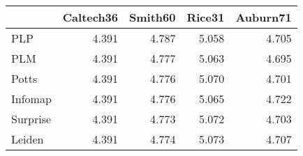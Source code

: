 \begin{tabular}{lrrrr}
\toprule
{} & Caltech36 & Smith60 & Rice31 & Auburn71 \\
\midrule
PLP      &     4.391 &   4.787 &  5.058 &    4.705 \\
PLM      &     4.391 &   4.777 &  5.063 &    4.695 \\
Potts    &     4.391 &   4.776 &  5.070 &    4.701 \\
Infomap  &     4.391 &   4.776 &  5.065 &    4.722 \\
Surprise &     4.391 &   4.773 &  5.072 &    4.703 \\
Leiden   &     4.391 &   4.774 &  5.073 &    4.707 \\
\bottomrule
\end{tabular}
